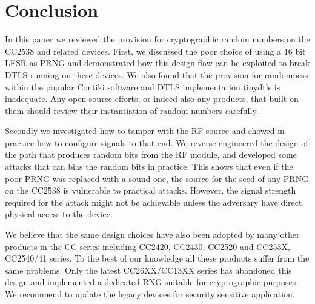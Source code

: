 \section{Conclusion}\label{Conclusion}
In this paper we reviewed the provision for cryptographic random numbers on the CC2538 and related devices. First, we discussed the poor choice of using a 16 bit LFSR as PRNG  and demonstrated how this design flaw can be exploited to break DTLS running on these devices. We also found that the provision for randomness within the popular Contiki software and DTLS implementation tinydtls is inadequate. Any open source efforts, or indeed also any products, that built on them should review their instantiation of random numbers carefully. 

Secondly we investigated how to tamper with the RF source and showed in practice how to configure signals to that end. We reverse engineered the design of the path that produces random bits from the RF module, and developed some attacks that can bias the random bits in practice. This shows that even if the poor PRNG was replaced with a sound one, the source for the seed of any PRNG on the CC2538 is vulnerable to practical attacks. However, the signal strength required for the attack might not be achievable unless the adversary have direct physical access to the device.

We believe that the same design choices have also been adopted by many other products in the CC series including CC2420\cite{CC2420Manual}, CC2430\cite{CC2430Manual}, CC2520\cite{CC2520Manual} and CC253X, CC2540/41 series\cite{CC2530Manual}. To the best of our knowledge all these products suffer from the same problems. Only the latest CC26XX/CC13XX\cite{CC26XXManual} series has abandoned this design and implemented a dedicated RNG suitable for cryptographic purposes. We recommend to update the legacy devices for security sensitive application.
